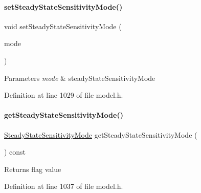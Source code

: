 \paragraph{\texorpdfstring{set\+Steady\+State\+Sensitivity\+Mode()}{setSteadyStateSensitivityMode()}}
{\footnotesize\ttfamily void set\+Steady\+State\+Sensitivity\+Mode (\begin{DoxyParamCaption}\item[{const \mbox{\hyperlink{namespaceamici_a1f7d44f04185d57423d01d47d13470a6}{Steady\+State\+Sensitivity\+Mode}}}]{mode }\end{DoxyParamCaption})}


\begin{DoxyParams}{Parameters}
{\em mode} & steady\+State\+Sensitivity\+Mode \\
\hline
\end{DoxyParams}


Definition at line 1029 of file model.\+h.

\mbox{\label{classamici_1_1_model_abe272de7f41f621d27d169f7918ecac3}} 
\paragraph{\texorpdfstring{get\+Steady\+State\+Sensitivity\+Mode()}{getSteadyStateSensitivityMode()}}
{\footnotesize\ttfamily \mbox{\hyperlink{namespaceamici_a1f7d44f04185d57423d01d47d13470a6}{Steady\+State\+Sensitivity\+Mode}} get\+Steady\+State\+Sensitivity\+Mode (\begin{DoxyParamCaption}{ }\end{DoxyParamCaption}) const}

\begin{DoxyReturn}{Returns}
flag value 
\end{DoxyReturn}


Definition at line 1037 of file model.\+h.

\mbox{\label{classamici_1_1_model_aaf26e3d4c8b574bc7e63f8beea677bcb}} 
